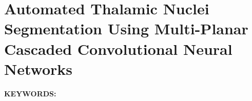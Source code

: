 \renewcommand{\figurepath}[1]{Chapters/thalamus/figures/#1}

\chapter{Automated Thalamic Nuclei Segmentation Using Multi-Planar Cascaded Convolutional Neural Networks}\label{ch:thalamus}
\textbf{KEYWORDS:\ } %

\newpage


